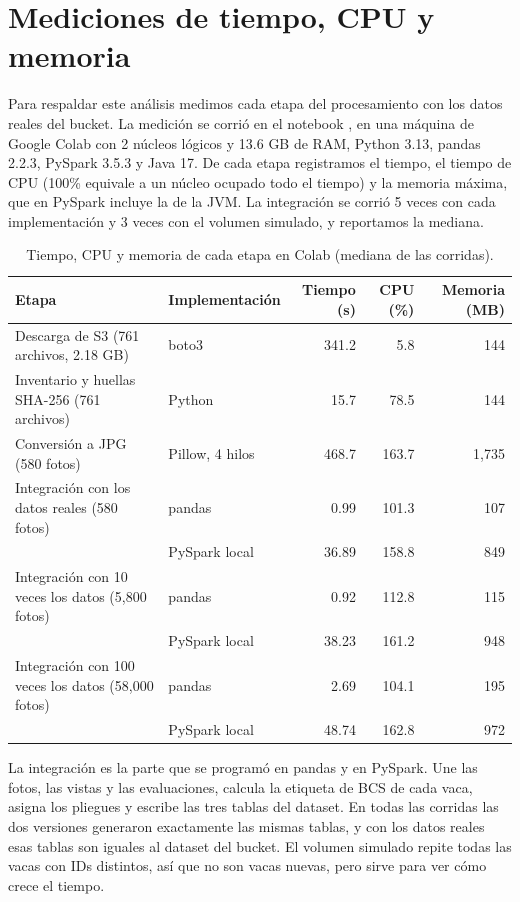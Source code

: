 \documentclass[11pt,letterpaper,DIV=12]{scrartcl}
\begin{document}
\section{Mediciones de tiempo, CPU y memoria}\label{sec:mediciones}

Para respaldar este análisis medimos cada etapa del procesamiento con los datos reales del bucket. La medición se corrió en el notebook , en una máquina de Google Colab con 2 núcleos lógicos y 13.6 GB de RAM, Python 3.13, pandas 2.2.3, PySpark 3.5.3 y Java 17. De cada etapa registramos el tiempo, el tiempo de CPU (100\% equivale a un núcleo ocupado todo el tiempo) y la memoria máxima, que en PySpark incluye la de la JVM. La integración se corrió 5 veces con cada implementación y 3 veces con el volumen simulado, y reportamos la mediana.

\begin{table}[H]
  \centering
  \small
  \caption{Tiempo, CPU y memoria de cada etapa en Colab (mediana de las corridas).}
  \label{tab:mediciones}
  \begin{tabularx}{\textwidth}{>{\raggedright\arraybackslash}X>{\raggedright\arraybackslash}p{}rrr}
    \toprule
    Etapa & Implementación & Tiempo (s) & CPU (\%) & Memoria (MB) \\
    \midrule
    Descarga de S3 (761 archivos, 2.18 GB) & boto3 & 341.2 & 5.8 & 144 \\
    Inventario y huellas SHA-256 (761 archivos) & Python & 15.7 & 78.5 & 144 \\
    Conversión a JPG (580 fotos) & Pillow, 4 hilos & 468.7 & 163.7 & 1{,}735 \\
    \addlinespace
    Integración con los datos reales (580 fotos) & pandas & 0.99 & 101.3 & 107 \\
     & PySpark local & 36.89 & 158.8 & 849 \\
    \addlinespace
    Integración con 10 veces los datos (5{,}800 fotos) & pandas & 0.92 & 112.8 & 115 \\
     & PySpark local & 38.23 & 161.2 & 948 \\
    \addlinespace
    Integración con 100 veces los datos (58{,}000 fotos) & pandas & 2.69 & 104.1 & 195 \\
     & PySpark local & 48.74 & 162.8 & 972 \\
    \bottomrule
  \end{tabularx}
\end{table}

La integración es la parte que se programó en pandas y en PySpark. Une las fotos, las vistas y las evaluaciones, calcula la etiqueta de BCS de cada vaca, asigna los pliegues y escribe las tres tablas del dataset. En todas las corridas las dos versiones generaron exactamente las mismas tablas, y con los datos reales esas tablas son iguales al dataset del bucket. El volumen simulado repite todas las vacas con IDs distintos, así que no son vacas nuevas, pero sirve para ver cómo crece el tiempo.
\end{document}
